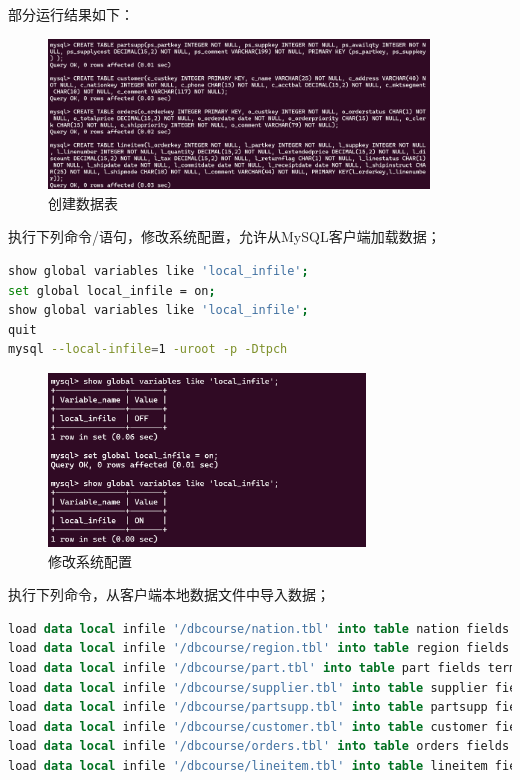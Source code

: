 \documentclass{article}
\begin{document}
部分运行结果如下：

\begin{figure}[H]
\centering
\includegraphics[width=0.9\textwidth]{img/9.png}
\caption{创建数据表}
\end{figure}

执行下列命令/语句，修改系统配置，允许从MySQL客户端加载数据；

\begin{lstlisting}[language=bash]
show global variables like 'local_infile';
set global local_infile = on;
show global variables like 'local_infile';
quit
mysql --local-infile=1 -uroot -p -Dtpch
\end{lstlisting}

\begin{figure}[H]
\centering
\includegraphics[width=0.75\textwidth]{img/10.png}
\caption{修改系统配置}
\end{figure}

执行下列命令，从客户端本地数据文件中导入数据；

\begin{lstlisting}[language=sql]
load data local infile '/dbcourse/nation.tbl' into table nation fields terminated by '|' lines terminated by '\n';
load data local infile '/dbcourse/region.tbl' into table region fields terminated by '|' lines terminated by '\n';
load data local infile '/dbcourse/part.tbl' into table part fields terminated by '|' lines terminated by '\n';
load data local infile '/dbcourse/supplier.tbl' into table supplier fields terminated by '|' lines terminated by '\n';
load data local infile '/dbcourse/partsupp.tbl' into table partsupp fields terminated by '|' lines terminated by '\n';
load data local infile '/dbcourse/customer.tbl' into table customer fields terminated by '|' lines terminated by '\n';
load data local infile '/dbcourse/orders.tbl' into table orders fields terminated by '|' lines terminated by '\n';
load data local infile '/dbcourse/lineitem.tbl' into table lineitem fields terminated by '|' lines terminated by '\n';
\end{lstlisting}
\end{document}
